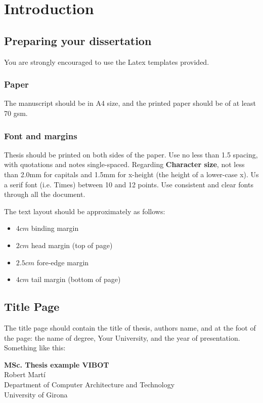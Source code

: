 \chapter{Introduction} \label{chap:intro}

\section{Preparing your dissertation} \label{sect:thefirst}

You are strongly encouraged to use the Latex templates provided.

\subsection{Paper}
The manuscript should be in A4 size, and the printed paper should
be of at least 70 gsm.

\subsection{Font and margins}
Thesis should be printed on both sides of the paper. Use no less
than 1.5 spacing, with quotations and notes single-spaced.
Regarding \textbf{Character size}, not less than 2.0mm for
capitals and 1.5mm for x-height (the height of a lower-case x). Us
a serif font (i.e. Times) between 10 and 12 points. Use consistent
and clear fonts through all the document.

The text layout should be approximately as follows:

\begin{itemize}
    \item $4cm$ binding margin
    \item $2cm$ head margin (top of page)
    \item $2.5cm$ fore-edge margin
    \item $4cm$ tail margin (bottom of page)
\end{itemize}

\section{Title Page}
The title page should contain the title of thesis, authors name,
and at the foot of the page: the name of degree,  Your University,
and the year of presentation. Something like this:

\vspace*{1cm}
\begin{center}
{\Large\bf MSc. Thesis example VIBOT\\} \vspace{2cm} {\large
Robert Mart\'i\\
\vspace{1cm}
Department of Computer Architecture and Technology\cite{platel1997plant} \\
University of Girona}

\end{center}

